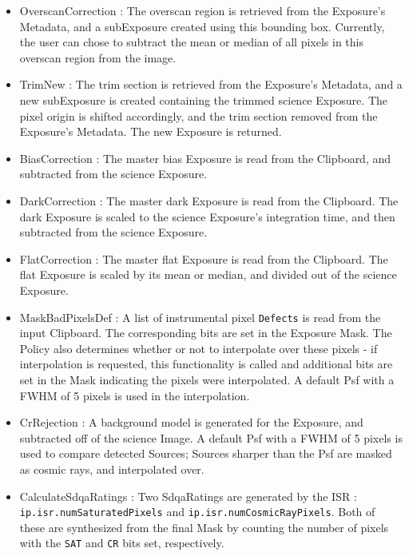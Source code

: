 \begin{itemize}
\item OverscanCorrection : The overscan region is retrieved from the
Exposure's Metadata, and a subExposure created using this bounding
box.  Currently, the user can chose to subtract the mean or median of
all pixels in this overscan region from the image.  

\item TrimNew : The trim section is retrieved from the Exposure's
Metadata, and a new subExposure is created containing the trimmed
science Exposure.  The pixel origin is shifted accordingly, and the
trim section removed from the Exposure's Metadata.  The new Exposure
is returned.

\item BiasCorrection : The master bias Exposure is read from the
Clipboard, and subtracted from the science Exposure.

\item DarkCorrection : The master dark Exposure is read from the
Clipboard.  The dark Exposure is scaled to the science Exposure's
integration time, and then subtracted from the science Exposure.

\item FlatCorrection : The master flat Exposure is read from the
Clipboard.  The flat Exposure is scaled by its mean or median, and
divided out of the science Exposure.

\iffalse
\item IlluminationCorrection : This is the same functionality as {\tt
FlatCorrection}.   \RHL{...but may need a different flat, depending on
how we handle the photometric v. cosmetic flats.}
\fi

\item MaskBadPixelsDef : A list of instrumental pixel \texttt{Defects} is read 
from the input Clipboard.  The corresponding bits are set in the
Exposure Mask.  The Policy also determines whether or not to
interpolate over these pixels - if interpolation is requested, this
functionality is called and additional bits are set in the Mask
indicating the pixels were interpolated.  A default Psf with a FWHM of
5 pixels is used in the interpolation.

\item CrRejection : A background model is generated for the Exposure, 
and subtracted off of the science Image.  A default Psf with a FWHM of
5 pixels is used to compare detected Sources; Sources sharper than the
Psf are masked as cosmic rays, and interpolated over.

\item CalculateSdqaRatings : Two SdqaRatings are generated by the ISR : 
{\tt ip.isr.numSaturatedPixels} and {\tt ip.isr.numCosmicRayPixels}.
Both of these are synthesized from the final Mask by counting the
number of pixels with the {\tt SAT} and {\tt CR} bits set,
respectively.

\end{itemize}

